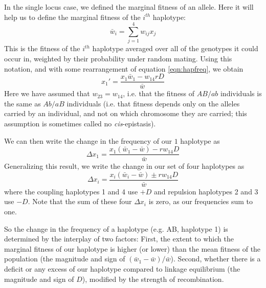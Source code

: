 In the single locus case, we defined the marginal fitness of an allele. Here it will help us to define the marginal fitness of the $i^{th}$ haplotype:
\begin{equation}
\bar{w}_i = \sum_{j=1}^4 w_{ij} x_j
\end{equation}
This is the fitness of the $i^{th}$ haplotype averaged over all of the  genotypes it could occur in, weighted by their probability under random mating. Using this notation, and with some rearrangement of equation \eqref{eqn:hapfreq}, we obtain
\begin{equation}
x_1' = \frac{x_1\bar{w}_1 - w_{14} r D}{\bar{w}}
\end{equation}
Here we have assumed that $w_{23}=w_{14}$, i.e. that the fitness of $AB/ab$ individuals is the same as $Ab/aB$ individuals (i.e. that fitness depends only on the alleles carried by an individual, and not on which chromosome they are carried; this assumption is sometimes called no {\it cis}-epistasis). 

We can then write the change in the frequency of our $1$ haplotype as 
\begin{equation}
\Delta x_1= \frac{x_1(\bar{w}_1-\bar{w}) -r w_{14} D}{\bar{w}}
\end{equation}
Generalizing this result, we write the change in  our set of four haplotypes as
\begin{equation}
\Delta x_i= \frac{x_i(\bar{w}_i-\bar{w}) \pm r w_{14} D}{\bar{w}}
\end{equation}
where the coupling haplotypes 1 and 4 use $+D$ and repulsion haplotypes 2 and 3 use $-D$.  Note that the sum of these four $\Delta x_i$ is zero, as our  frequencies sum to one.

So the change in the frequency of a haplotype (e.g. AB, haplotype 1) is determined by the interplay of two factors: First, the extent to which  the marginal fitness of our haplotype is higher (or lower) than the mean fitness of the population (the magnitude and sign of $(\bar{w}_1-\bar{w})/\bar{w}$). Second, whether there is a deficit or any excess of our haplotype compared to linkage equilibrium (the magnitude and sign of $D$), modified by the strength of recombination. 

